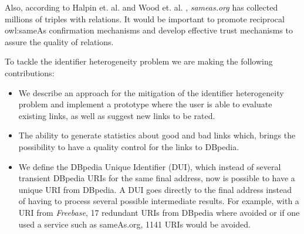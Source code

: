 
Also, according to Halpin et. al. \cite{DBLP:conf/semweb/HalpinHMMT10} and Wood et. al. \cite{dwood2014}, \textit{sameas.org} has collected millions of triples with  relations.
It would be important to promote reciprocal owl:sameAs confirmation mechanisms and develop effective trust mechanisms to assure the quality of  relations.






To tackle the identifier heterogeneity problem we are making the following contributions:
\begin{itemize}
\item We describe an approach for the mitigation of the identifier heterogeneity problem and implement a prototype where the user is able to evaluate existing links, as well as suggest new links to be rated.
\item The ability to generate statistics about good and bad links which, brings the possibility to have a quality control for the links to DBpedia. %
\item We define the DBpedia Unique Identifier (DUI), which instead of several transient  DBpedia URIs for the same final address, now is possible to have a unique URI from DBpedia.
A DUI goes directly to the final address instead of having to process several possible intermediate results.
For example, with a URI from \textit{Freebase}, 17 redundant URIs from DBpedia where avoided or if one used a service such as sameAs.org, 1141 URIs would be avoided.

\end{itemize}

